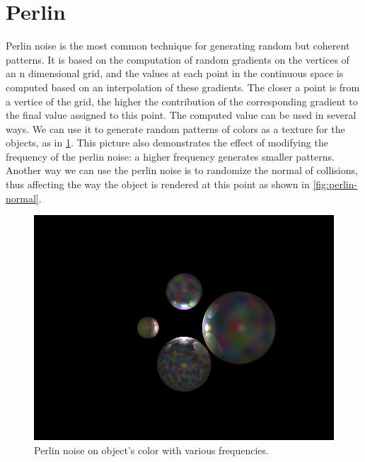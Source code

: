 \documentclass[a4paper,12pt,journal,twoside,compsoc]{PPIEEEtran}
\begin{document}
\section{Perlin}

Perlin noise is the most common technique for generating random but coherent
patterns.  It is based on the computation of random gradients on the vertices of
an n dimensional grid, and the values at each point in the continuous space is
computed based on an interpolation of these gradients.  The closer a point is
from a vertice of the grid, the higher the contribution of the corresponding
gradient to the final value assigned to this point.  The computed value can be
used in several ways.  We can use it to generate random patterns of colors as a
texture for the objects, as in \cref{fig:perlin-color}.  This picture also
demonstrates the effect of modifying the frequency of the perlin noise: a higher
frequency generates smaller patterns.  Another way we can use the perlin noise
is to randomize the normal of collisions, thus affecting the way the object
is rendered at this point as shown in \cref{fig:perlin-normal}.

\begin{figure}
  \begin{center}
    \includegraphics[width=0.7\linewidth]{perlin-color.png}
  \end{center}
  \caption{Perlin noise on object's color with various frequencies.}
  \label{fig:perlin-color}
\end{figure}
\end{document}
